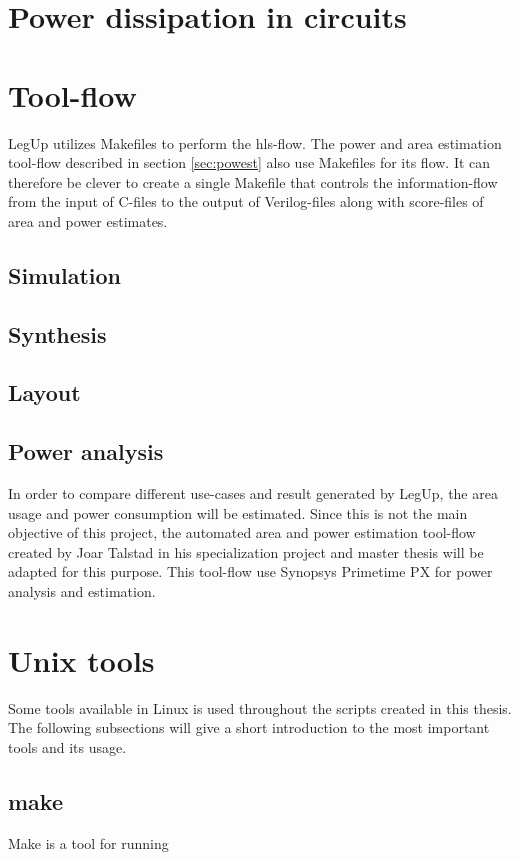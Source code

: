 \section{Power dissipation in circuits}

\section{Tool-flow}
LegUp utilizes Makefiles to perform the \gls{hls}-flow. The power and area estimation tool-flow described in section \ref{sec:powest} also use Makefiles for its flow. It can therefore be clever to create a single Makefile that controls the information-flow from the input of C-files to the output of Verilog-files along with score-files of area and power estimates. 

\subsection{Simulation}

\subsection{Synthesis}

\subsection{Layout}

\subsection{\label{sec:powest}Power analysis}
In order to compare different use-cases and result generated by LegUp, the area usage and power consumption will be estimated. Since this is not the main objective of this project, the automated area and power estimation tool-flow created by Joar Talstad in his specialization project \cite{talstad14project} and master thesis \cite{talstad15master} will be adapted for this purpose. This tool-flow use Synopsys Primetime PX for power analysis and estimation.

\section{Unix tools}
Some tools available in Linux is used throughout the scripts created in this thesis. The following subsections will give a short introduction to the most important tools and its usage.
\subsection{make}
Make is a tool for running 
